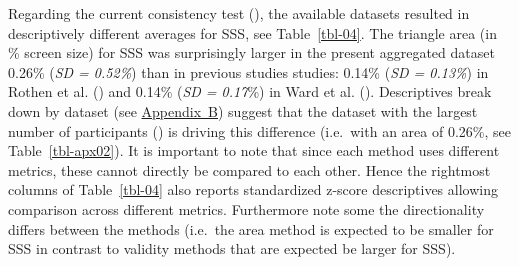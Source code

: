 \documentclass[
  man,
  floatsintext,
  longtable,
  a4paper,
  nolmodern,
  notxfonts,
  notimes,
  colorlinks=true,linkcolor=blue,citecolor=blue,urlcolor=blue]{apa7}
\begin{document}
Regarding the current consistency test (), the available datasets resulted in descriptively
different averages for SSS, see Table~\ref{tbl-04}. The triangle area
(in \% screen size) for SSS was surprisingly larger in the present
aggregated dataset 0.26\% (\emph{SD = 0.52\%}) than in previous studies
studies: 0.14\% (\emph{SD = 0.13\%}) in Rothen et al.
() and 0.14\% (\emph{SD = 0.17}\%) in
Ward et al. (). Descriptives break down by
dataset (see \hyperref[apx-SM2byds]{Appendix~B}) suggest that the
dataset with the largest number of participants
() is driving this difference
(i.e.~with an area of 0.26\%, see Table~\ref{tbl-apx02}). It is
important to note that since each method uses different metrics, these
cannot directly be compared to each other. Hence the rightmost columns
of Table~\ref{tbl-04} also reports standardized z-score descriptives
allowing comparison across different metrics. Furthermore note some the
directionality differs between the methods (i.e.~the area method is
expected to be smaller for SSS in contrast to validity methods that are
expected be larger for SSS).
\end{document}
